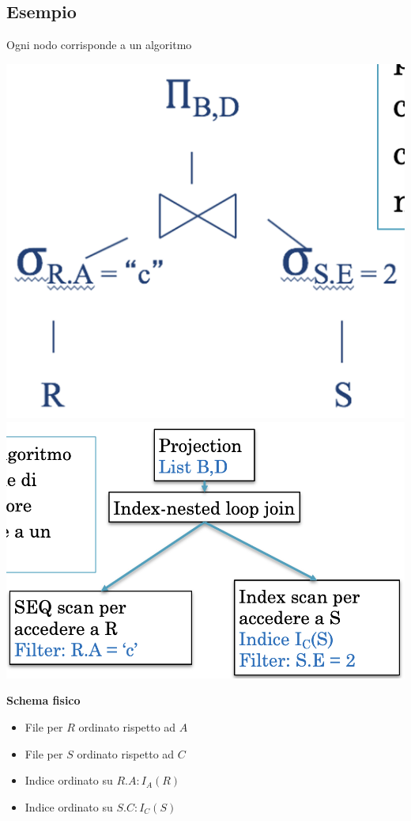 \documentclass[12pt, a4paper]{report}
\begin{document}
    \subsection{Esempio}
    Ogni nodo corrisponde a un algoritmo
    \begin{center}
        \includegraphics[scale=0.6]{Appunti Latex/Immagini/esempioalberolivellofisico.png}
        \includegraphics[scale=0.6]{Appunti Latex/Immagini/esempioalberofisico.png}
    \end{center}
    \textbf{Schema fisico}
    \begin{itemize}
        \item File per $R$ ordinato rispetto ad $A$
        \item File per $S$ ordinato rispetto ad $C$
        \item Indice ordinato su $R.A:I_{A}(R)$
        \item Indice ordinato su $S.C:I_{C}(S)$
    \end{itemize}
\end{document}
